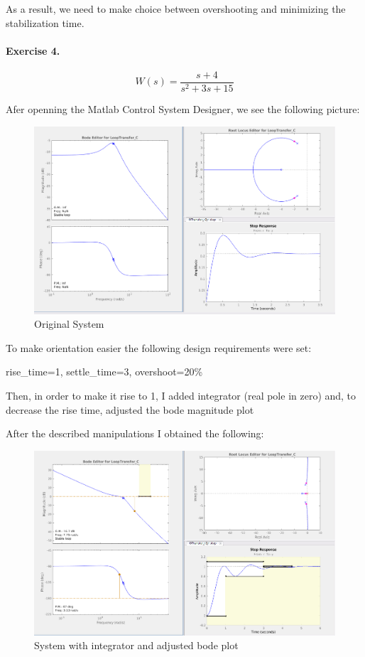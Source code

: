\documentclass{article}
\begin{document}
\noindent
As a result, we need to make choice between overshooting and minimizing the stabilization time.

\newpage

\paragraph{Exercise 4.}

$$ W(s) = \frac{s + 4}{s^2 + 3s + 15}$$

\noindent
Afer openning the Matlab Control System Designer, we see the following picture:

\begin{figure}[hbt!]
        \centering
        \includegraphics[scale=0.3]{hw3_41.png}
        \caption{Original System}
\end{figure}

To make orientation easier the following design requirements were set: 

\noindent
rise\_time=1, settle\_time=3, overshoot=20\%

\bigbreak
Then,  in order to make it rise to 1, I added integrator (real pole in zero) and, to decrease the rise time, adjusted the bode magnitude plot

\newpage

\noindent
After the described manipulations I obtained the following:

\begin{figure}[hbt!]
        \centering
        \includegraphics[scale=0.3]{hw3_42.png}
        \caption{System with integrator and adjusted bode plot}
\end{figure}
\end{document}
